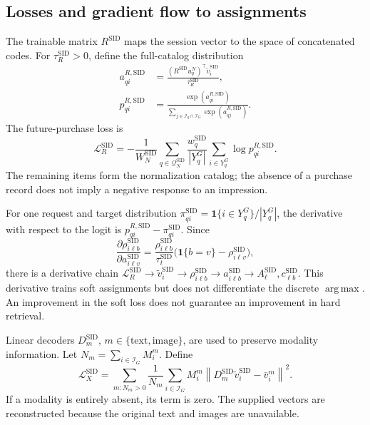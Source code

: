 \documentclass[12pt,a4paper]{article}
\newcommand{\ind}{\mathbf 1}
\newcommand{\norm}[1]{\left\lVert#1\right\rVert}
\DeclareMathOperator*{\argmax}{arg\,max}
\theoremstyle{plainru}
\begin{document}
\subsection{Losses and gradient flow to assignments}
\label{sec:sid-loss}

The trainable matrix $R^{\mathrm{SID}}$ maps the session vector
to the space of concatenated codes. For $\tau_R^{\mathrm{SID}}>0$,
define the full-catalog distribution
\begin{align}\label{eq:sid-full-prob}
 a_{qi}^{R,\mathrm{SID}}
 &=\frac{(R^{\mathrm{SID}}u_q^N)^\top
                  \widetilde v_i^{\mathrm{SID}}}
                {\tau_R^{\mathrm{SID}}},\\
 p_{qi}^{R,\mathrm{SID}}
 &=\frac{\exp(a_{qi}^{R,\mathrm{SID}})}
 {\sum_{j\in\mathcal I_q\cap\mathcal I_G}
             \exp(a_{qj}^{R,\mathrm{SID}})}.
\end{align}
The future-purchase loss is
\begin{equation}\label{eq:sid-rec-loss}
 \mathcal L_R^{\mathrm{SID}}
 =-\frac{1}{W_N^{\mathrm{SID}}}
 \sum_{q\in\mathcal Q_N^{\mathrm{SID}}}
 \frac{w_q^{\mathrm{SID}}}{|Y_q^G|}
       \sum_{i\in Y_q^G}\log p_{qi}^{R,\mathrm{SID}}.
\end{equation}
The remaining items form the normalization catalog;
the absence of a purchase record does not imply a negative response to an impression.

For one request and target distribution
$\pi_{qi}^{\mathrm{SID}}=\ind\{i\in Y_q^G\}/|Y_q^G|$,
the derivative with respect to the logit is
$p_{qi}^{R,\mathrm{SID}}-\pi_{qi}^{\mathrm{SID}}$.
Since
\begin{equation}\label{eq:sid-soft-gradient}
 \frac{\partial\rho_{i\ell b}^{\mathrm{SID}}}
      {\partial a_{i\ell v}^{\mathrm{SID}}}
 =\frac{\rho_{i\ell b}^{\mathrm{SID}}}
            {\tau_t^{\mathrm{SID}}}
       \bigl(\ind\{b=v\}-\rho_{i\ell v}^{\mathrm{SID}}\bigr),
\end{equation}
there is a derivative chain
$\mathcal L_R^{\mathrm{SID}}\to\widetilde v_i^{\mathrm{SID}}
\to\rho_{i\ell b}^{\mathrm{SID}}\to a_{i\ell b}^{\mathrm{SID}}
\to A_\ell^{\mathrm{SID}},c_{\ell b}^{\mathrm{SID}}$.
This derivative trains soft assignments but does not differentiate
the discrete $\argmax$. An improvement in the soft loss does not guarantee
an improvement in hard retrieval.

Linear decoders $D_m^{\mathrm{SID}}$, $m\in\{\mathrm{text},\mathrm{image}\}$,
are used to preserve modality information.
Let $N_m=\sum_{i\in\mathcal I_G}M_i^m$. Define
\begin{equation}\label{eq:sid-reconstruction}
 \mathcal L_X^{\mathrm{SID}}
 =\sum_{m:N_m>0}\frac{1}{N_m}
 \sum_{i\in\mathcal I_G}M_i^m
 \norm{D_m^{\mathrm{SID}}\widetilde v_i^{\mathrm{SID}}
                        -\bar v_i^m}^{2}.
\end{equation}
If a modality is entirely absent, its term is zero.
The supplied vectors are reconstructed because the original text
and images are unavailable.
\end{document}

